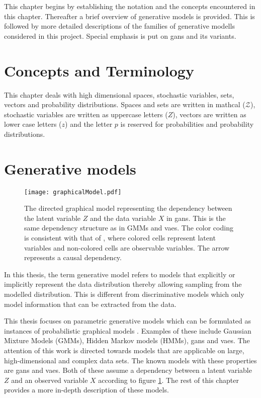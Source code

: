 This chapter begins by establishing the notation and the concepts encountered in this chapter. Thereafter a brief overview of generative models is provided. This is followed by more detailed descriptions of the families of generative modells considered in this project. Special emphasis is put on \acrlong{gans} and its variants.

\section{Concepts and Terminology}
This chapter deals with high dimensional spaces, stochastic variables, sets, vectors and probability distributions. Spaces and sets are written in mathcal ($\mathcal{Z}$), stochastic variables are written as uppercase letters ($Z$), vectors are written as lower case letters ($z$) and the letter $p$ is reserved for probabilities and probability distributions. 

\section{Generative models}
\begin{figure}[t]
    \centering
    \texttt{[image: graphicalModel.pdf]}
    \caption{The directed graphical model representing the dependency between the latent variable $Z$ and the data variable $X$ in \acrshort{gans}. This is the same dependency structure as in GMMs and \acrshort{vaes}. The color coding is consistent with that of \textcite{christopher2016pattern}, where colored cells represent latent variables and non-colored cells are observable variables. The arrow represents a causal dependency.}
    \label{fig:GANgraph}
\end{figure}
In this thesis, the term generative model refers to models that explicitly or implicitly represent the data distribution thereby allowing sampling from the modelled distribution. This is different from discriminative models which only model information that can be extracted from the data. 

This thesis focuses on parametric generative models which can be formulated as instances of probabilistic graphical models \parencite{christopher2016pattern}. Examples of these include Gaussian Mixture Models (GMMs), Hidden Markov models (HMMs), \acrfull{gans} and \acrfull{vaes}. The attention of this work is directed towards models that are applicable on large, high-dimensional and complex data sets. The known models with these properties are  \acrshort{gans} and \acrshort{vaes}. Both of these assume a dependency between a latent variable $Z$ and an observed variable $X$ according to figure \ref{fig:GANgraph}. The rest of this chapter provides a more in-depth description of these models. 

